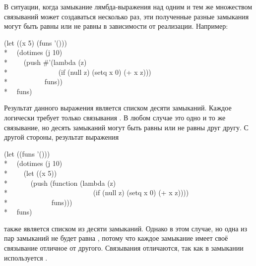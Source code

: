 \begin{defspec}
В ситуации, когда замыкание лямбда-выражения над одним и тем же множеством
связываний может создаваться несколько раз, эти полученные разные замыкания
могут быть равны или не равны  в зависимости от реализации.
Например:
\begin{lisp}
(let ((x 5) (funs '())) \\*
~~(dotimes (j 10) \\*
~~~~(push \#'(lambda (z) \\*
~~~~~~~~~~~~~~(if (null z) (setq x 0) (+ x z))) \\*
~~~~~~~~~~funs)) \\*
~~funs)
\end{lisp}
Результат данного выражения является списком десяти замыканий.
Каждое логически требует только связывания .
В любом случае это одно и то же связывание, но десять замыканий могут быть равны
или не равны  друг другу.
С другой стороны, результат выражения
\begin{lisp}
(let ((funs '())) \\*
~~(dotimes (j 10) \\*
~~~~(let ((x 5)) \\*
~~~~~~(push (function (lambda (z) \\*
~~~~~~~~~~~~~~~~~~~~~~~~(if (null z) (setq x 0) (+ x z)))) \\*
~~~~~~~~~~~~funs))) \\*
~~funs)
\end{lisp}
также является списком из десяти замыканий.
Однако в этом случае, но одна из пар замыканий не будет равна , потому
что каждое замыкание имеет своё связывание  отличное от
другого. Связывания отличаются, так как в замыкании используется .


\end{defspec}
